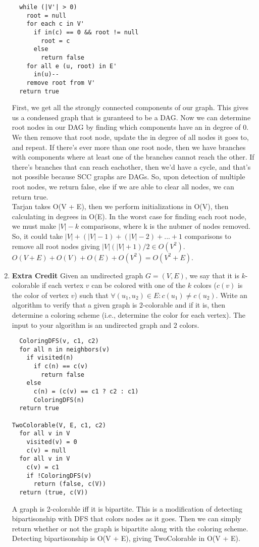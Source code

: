 \documentclass[11pt]{article}
\begin{document}
\begin{enumerate}
\begin{verbatim}
  while (|V'| > 0)
    root = null
    for each c in V'
      if in(c) == 0 && root != null
        root = c
      else
        return false
    for all e (u, root) in E'
      in(u)--
    remove root from V'
  return true
\end{verbatim}

First, we get all the strongly connected components of our graph.
This gives us a condensed graph that is guranteed to be a DAG.
Now we can determine root nodes in our DAG by finding which components have an in degree of 0.
We then remove that root node, update the in degree of all nodes it goes to, and repeat.
If there's ever more than one root node, then we have branches with components where at least one of the branches cannot reach the other.
If there's branches that can reach eachother, then we'd have a cycle, and that's not possible because SCC graphs are DAGs.
So, upon detection of multiple root nodes, we return false, else if we are able to clear all nodes, we can return true. \\
Tarjan takes O(V + E), then we perform initializations in O(V), then calculating in degrees in O(E).
In the worst case for finding each root node, we must make $|V| - k$ comparisons, where k is the nubmer of nodes removed.
So, it could take $|V| + (|V| - 1) + (|V| - 2) + ... + 1$ comparisons to remove all root nodes giving $|V|(|V| + 1)/2 \in O(V^2)$.
$O(V + E) + O(V) + O(E) + O(V^2) = O(V^2 + E)$.

\newpage

\item \textbf{Extra Credit}
Given an undirected graph $G = (V, E)$, we say that it is $k$-colorable
if each vertex $v$ can be colored with one of the $k$ colors ($c(v)$
is the color of vertex $v$) such that $\forall (u_1, u_2)\in E: c(u_1)
\neq c(u_2)$. Write an algorithm to verify that a given graph is
$2$-colorable and if it is, then determine a coloring scheme (i.e.,
determine the color for each vertex). The input to your algorithm
is an undirected graph and $2$ colors. 

\begin{verbatim}
  ColoringDFS(v, c1, c2)
  for all n in neighbors(v)
    if visited(n)
      if c(n) == c(v)
        return false
    else
      c(n) = (c(v) == c1 ? c2 : c1)
      ColoringDFS(n)
  return true

TwoColorable(V, E, c1, c2)
  for all v in V
    visited(v) = 0
    c(v) = null
  for all v in V
    c(v) = c1
    if !ColoringDFS(v)
      return (false, c(V))
  return (true, c(V))
\end{verbatim}

A graph is 2-colorable iff it is bipartite.
This is a modification of detecting bipartisonship with DFS that colors nodes as it goes.
Then we can simply return whether or not the graph is bipartite along with the coloring scheme. \\
Detecting bipartisonship is O(V + E), giving TwoColorable in O(V + E).

  \end{enumerate}
\end{document}

